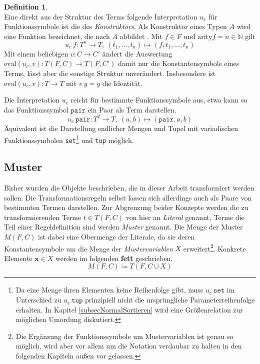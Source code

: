 \documentclass{scrartcl}
\numberwithin{figure}{section} %
\theoremstyle{definition} %
\newcommand{\elems}[3]{{#1}_{#2}, \dots, {#1}_{#3}}
\newcommand{\tOneN}{\elems t 1 n}
\begin{document}
\newtheorem{defKonstruktor}[bsp]{Definition}
\begin{defKonstruktor}~\\
Eine direkt aus der Struktur des Terms folgende Interpretation $u_c$ für Funktionssymbole ist die des \emph{Konstruktors}. Als Konstruktor eines Typen $A$ wird eine Funktion bezeichnet, die nach $A$ abbildet \cite{haskellConstructor}. Mit $f \in F$ und $\mathrm{arity} f = n \in \mathbb N$ 
gilt $$u_c~f \colon T^n \rightarrow T, ~(\tOneN) \mapsto (f, \tOneN)$$
Mit einem beliebigen $v \colon C \rightarrow C'$ ändert die Auswertung $\mathrm{eval}(u_c, v) \colon T(F, C) \rightarrow T(F, C')$ damit nur die Konstantensymbole eines Terms, lässt aber die sonstige Struktur unverändert. Insbesondere ist $\mathrm{eval}(u_c, v) \colon T \rightarrow T$ mit $v~y = y$ die Identität.

Die Interpretation $u_c$ reicht für bestimmte Funktionssymbole aus, etwa kann so das Funktionssymbol $\texttt{pair}$ ein Paar als Term darstellen.
$$u_c~\texttt{pair} \colon T^2 \rightarrow T, ~(a, b) \mapsto (\texttt{pair}, a, b)$$
Äquivalent ist die Darstellung endlicher Mengen und Tupel mit variadischen Funktionssymbolen \texttt{set}\footnote{Da eine Menge ihren Elementen keine Reihenfolge gibt, muss $u_c~\texttt{set}$ im Unterschied zu $u_c~\texttt{tup}$ prinzipiell nicht die ursprüngliche Parameterreihenfolge erhalten. In Kapitel \ref{subsecNormalSortieren} wird eine Größenrelation zur möglichen Umordung diskutiert.} und \texttt{tup} möglich.
\end{defKonstruktor}


\subsection{Muster} \label{subsecMuster}

Bisher wurden die Objekte beschrieben, die in dieser Arbeit transformiert werden sollen. Die Transformationsregeln selbst lassen sich allerdings auch als Paare von bestimmten Termen darstellen. Zur Abgrenzung beider Konzepte werden die zu transformierenden Terme $t\in T(F, C)$ von hier an \emph{Literal} genannt, Terme die  Teil einer Regeldefinition sind werden \emph{Muster} genannt. Die Menge der Muster $M(F, C)$ ist dabei eine Obermenge der Literale, da sie deren Konstantensymbole um die Menge der \emph{Mustervariablen} $X$ erweitert\footnote{Die Ergänzung der Funktionssymbole um Mustervariablen ist genau so möglich, wird aber vor allem um die Notation verdaubar zu halten in den folgenden Kapiteln außen vor gelassen.}. Konkrete Elemente $\mathbf x \in X$ werden im folgenden \textbf{fett} geschrieben.
$$M(F, C) \coloneqq T(F, C \cup X)$$
\end{document}
